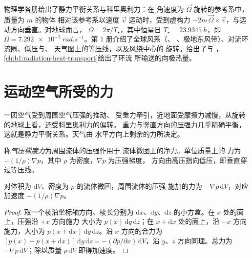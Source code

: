 \begin{recall}
物理学各册给出了静力平衡关系与科里奥利力：在
角速度为 $\vec\Omega$ 旋转的参考系中，质量为 $m$ 的物体
相对该参考系以速度 $\vec v$ 运动时，受到虚构力
$-2m\,\vec\Omega\times\vec v$，与运动方向垂直。对地球而言，
$\Omega = 2\pi/T_\star$，其中恒星日 $T_\star = \qty{23.9345}{h}$，即
$\Omega = \qty{7.292e-5}{rad.s^{-1}}$。第 1 册介绍了全球风系（、
、极地东风带）、对流环流圈、低压与、
天气图上的等压线，以及风绕中心的
旋转。给出了与
，\cref{ch:b1:radiation-heat-transport}给出了环流
所输送的向极热量。
\end{recall}

\section{运动空气所受的力}\label{sec:b1:atmospheric-circulation:forces}

一团空气受到周围空气压强的推动、
受重力牵引，近地面受摩擦力减慢，从旋转的地球上看，还受科里奥利力的偏转。
重力与竖直方向的压强力几乎精确平衡，
这就是静力平衡关系。天气由
水平方向上剩余的力所决定。

\begin{definition}[气压梯度力]\label{def:b1:atmospheric-circulation:pgf}
称\emph{气压梯度力}为周围流体的压强作用于
流体微团上的净力。单位质量上的
力为 $-(1/\rho)\nabla p$，其中 $\rho$ 为密度，$\nabla p$ 为压强梯度，
方向由高压指向低压，即垂直穿过等压线。
\end{definition}

\begin{proposition}[气压梯度力]\label{prop:b1:atmospheric-circulation:pgf}
对体积为 $\mathrm dV$、密度为 $\rho$ 的流体微团，周围流体的压强
施加的力为 $-\nabla p\,\mathrm dV$，对应加速度
$-(1/\rho)\nabla p$。
\end{proposition}

\begin{proof}
取一个棱沿坐标轴方向、棱长分别为
$\mathrm dx$、$\mathrm dy$、$\mathrm dz$ 的小方盒。在 $x$ 处的面上，压强沿 $+x$ 方向施力
大小为 $p(x)\,\mathrm dy\,\mathrm dz$；在 $x + \mathrm dx$ 处的面上，沿 $-x$ 方向
施力，大小为 $p(x + \mathrm dx)\,\mathrm dy\,\mathrm dz$。沿
$x$ 方向的合力为 $[p(x) - p(x + \mathrm dx)]\,\mathrm dy\,\mathrm dz = -(\partial p/\partial
x)\,\mathrm dV$，沿 $y$、$z$ 方向同理。总力为 $-\nabla p\,
\mathrm dV$；除以质量 $\rho\,\mathrm dV$ 即得加速度。
\end{proof}

